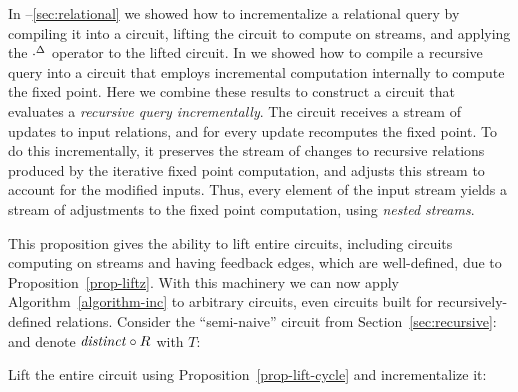 In --\ref{sec:relational} 
we showed how to incrementalize a relational query by
compiling it into a circuit, lifting the circuit to compute on streams, and
applying the ${\cdot}^{\Delta}$ operator to the lifted circuit.  In  we showed
how to compile a recursive query into a circuit that employs incremental
computation internally to compute the fixed point.
Here we combine these results to construct a circuit that evaluates a \emph{recursive
query incrementally}.  The circuit receives a stream of updates to input
relations, and for every update recomputes the fixed point.  To do this
incrementally, it preserves the stream of changes to recursive relations
produced by the iterative fixed point computation, and adjusts this stream to
account for the modified inputs.  Thus, every element of the input stream yields
a stream of adjustments to the fixed point computation, using
\emph{nested streams}.

This proposition gives the ability to lift
entire circuits, including circuits computing on streams and having feedback edges,
which are well-defined, due to Proposition~\ref{prop-liftz}.  
With this machinery we can now apply Algorithm~\ref{algorithm-inc} to arbitrary
circuits, even circuits built for recursively-defined relations.  
Consider the ``semi-naive'' circuit from Section~\ref{sec:recursive}:
and denote $\mathit{distinct} \circ R$ with $T$:

\begin{center}
\vspace{-2mm}
\end{center}

\noindent Lift the entire circuit using Proposition~\ref{prop-lift-cycle} and incrementalize it:

\begin{center}
\end{center}

